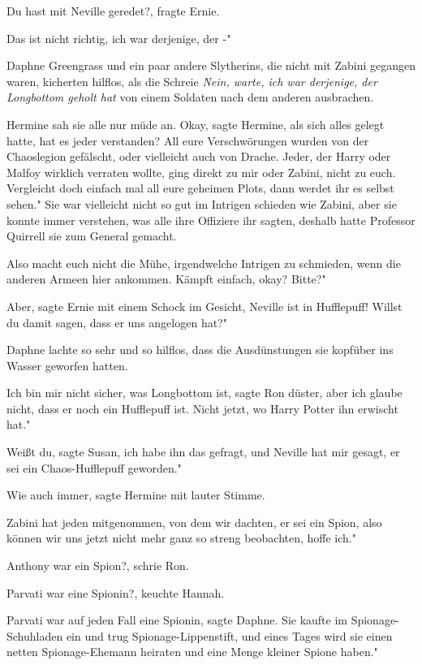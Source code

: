 \glqq Du hast mit Neville geredet?\grqq{}, fragte Ernie.

\glqq Das ist nicht richtig, ich war derjenige, der -"

Daphne Greengrass und ein paar andere Slytherins, die nicht mit Zabini gegangen
waren, kicherten hilflos, als die Schreie \glqq \emph{Nein, warte, ich war
derjenige, der Longbottom geholt hat\grqq{}} von einem Soldaten nach dem
anderen ausbrachen.

Hermine sah sie alle nur müde an. \glqq Okay\grqq{}, sagte Hermine, als sich
alles gelegt hatte, \glqq hat es jeder verstanden? All eure Verschwörungen
wurden von der Chaoslegion gefälscht, oder vielleicht auch von Drache. Jeder,
der Harry oder Malfoy wirklich verraten wollte, ging direkt zu mir oder Zabini,
nicht zu euch. Vergleicht doch einfach mal all eure geheimen Plots, dann werdet
ihr es selbst sehen." Sie war vielleicht nicht so gut im Intrigen schieden wie
Zabini, aber sie konnte immer verstehen, was alle ihre Offiziere ihr sagten,
deshalb hatte Professor Quirrell sie zum General gemacht.

\glqq Also macht euch nicht die Mühe, irgendwelche Intrigen zu schmieden, wenn
die anderen Armeen hier ankommen. Kämpft einfach, okay? Bitte?"

\glqq Aber\grqq{}, sagte Ernie mit einem Schock im Gesicht, \glqq Neville ist in
Hufflepuff! Willst du damit sagen, dass er uns angelogen hat?"

Daphne lachte so sehr und so hilflos, dass die Ausdünstungen sie kopfüber ins
Wasser geworfen hatten.

\glqq Ich bin mir nicht sicher, was Longbottom ist\grqq{}, sagte Ron düster,
\glqq aber ich glaube nicht, dass er noch ein Hufflepuff ist. Nicht jetzt, wo
Harry Potter ihn erwischt hat."

\glqq Weißt du\grqq{}, sagte Susan, \glqq ich habe ihn das gefragt, und Neville
hat mir gesagt, er sei ein Chaos-Hufflepuff geworden."

\glqq Wie auch immer\grqq{}, sagte Hermine mit lauter Stimme.

\glqq Zabini hat jeden mitgenommen, von dem wir dachten, er sei ein Spion, also
können wir uns jetzt nicht mehr ganz so streng beobachten, hoffe ich."

\glqq Anthony war ein Spion?\grqq{}, schrie Ron.

\glqq Parvati war eine Spionin?\grqq{}, keuchte Hannah.

\glqq Parvati war auf jeden Fall eine Spionin\grqq{}, sagte Daphne. \glqq Sie
kaufte im Spionage-Schuhladen ein und trug Spionage-Lippenstift, und eines Tages
wird sie einen netten Spionage-Ehemann heiraten und eine Menge kleiner Spione
haben."

